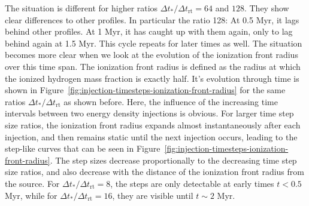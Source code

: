 The situation is different for higher ratios $\Delta t_* / \Delta t_{\mathrm{rt}} = 64$ and $128$.
They show clear differences to other profiles. In particular the ratio 128: At 0.5 Myr, it lags
behind other profiles. At 1 Myr, it has caught up with them again, only to lag behind again at 1.5
Myr. This cycle repeats for later times as well. The situation becomes more clear when we look at
the evolution of the ionization front radius over this time span. The ionization front radius is
defined as the radius at which the ionized hydrogen mass fraction is exactly half. It's evolution
through time is shown in Figure~\ref{fig:injection-timesteps-ionization-front-radius} for the same
ratios $\Delta t_* / \Delta t_{\mathrm{rt}}$ as shown before. Here, the influence of the increasing
time intervals between two energy density injections is obvious. For larger time step size ratios,
the ionization front radius expands almost instantaneously after each injection, and then remains
static until the next injection occurs, leading to the step-like curves that can be seen in
Figure~\ref{fig:injection-timesteps-ionization-front-radius}. The step sizes decrease proportionally
to the decreasing time step size ratios, and also decrease with the distance of the ionization
front radius from the source. For  $\Delta t_* / \Delta t_{\mathrm{rt}} = 8$, the steps are only
detectable at early times $t < 0.5$ Myr, while for  $\Delta t_* / \Delta t_{\mathrm{rt}} = 16$,
they are visible until $t \sim 2$ Myr.

